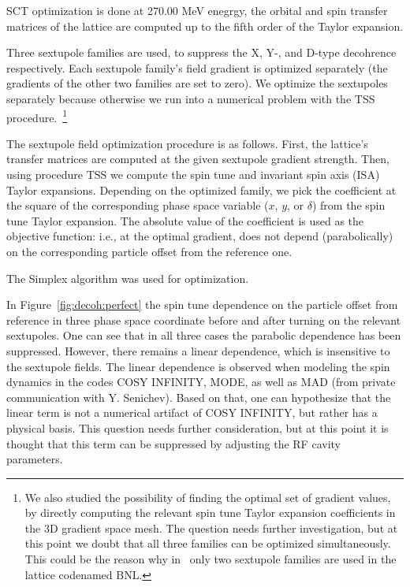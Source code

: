 SCT optimization is done at 270.00 MeV enegrgy, the orbital and spin transfer matrices of the lattice
are computed up to the fifth order of the Taylor expansion.

Three sextupole families are used, to suppress the X, Y-, and D-type decohrence respectively.
Each sextupole family's field gradient is optimized separately (the gradients of the other two
families are set to zero). We optimize the sextupoles separately because otherwise we run into a
numerical problem with the TSS procedure.~\footnote{We also studied the possibility of finding the optimal
  set of gradient values, by directly computing the relevant spin tune Taylor expansion coefficients in the
  3D gradient space mesh. The question needs further investigation, but at this point we doubt that all
  three families can be optimized simultaneously. This could be the reason why in~\cite[p.~219]{Eremey:Thesis}
  only two sextupole families are used in the lattice codenamed BNL.}

The sextupole field optimization procedure is as follows. First, the lattice's
transfer matrices are computed at the given sextupole gradient strength. Then, using procedure TSS
we compute the spin tune and invariant spin axis (ISA) Taylor expansions. Depending on the optimized family,
we pick the coefficient at the square of the corresponding phase space variable ($x$, $y$, or $\delta$)
from the spin tune Taylor expansion. The absolute value of the coefficient is used as the objective
function: i.e., at the optimal gradient, does not depend (parabolically) on the corresponding
particle offset from the reference one.

The Simplex algorithm was used for optimization.~\cite[p.~37]{COSYINF:Manual:Programmer}

In Figure~\ref{fig:decoh:perfect} the spin tune dependence on the particle offset from reference in three
phase space coordinate before and after turning on the relevant sextupoles. One can see that in all
three cases the parabolic dependence has been suppressed. However, there remains a linear dependence,
which is insensitive to the sextupole fields. The linear dependence is observed when modeling the spin
dynamics in the codes COSY INFINITY, MODE, as well as MAD (from private communication with Y. Senichev).
Based on that, one can hypothesize that the linear term is not a numerical artifact of  COSY INFINITY,
but rather has a physical basis. This question needs further consideration, but at this point it is thought that
this term can be suppressed by adjusting the RF cavity parameters.~\cite[p.~210,~219]{Eremey:Thesis}

